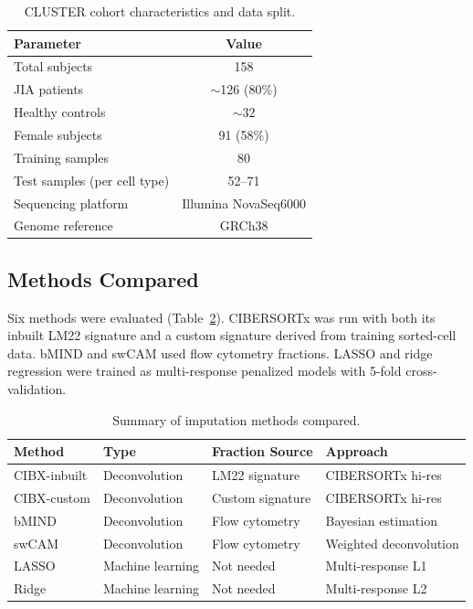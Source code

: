 \documentclass[12pt]{article}
\begin{document}
\begin{table}[htbp]
\centering
\caption{CLUSTER cohort characteristics and data split.}
\label{tab:cohort}
\begin{tabular}{lc}
\toprule
Parameter & Value \\
\midrule
Total subjects & 158 \\
JIA patients & $\sim$126 (80\%) \\
Healthy controls & $\sim$32 \\
Female subjects & 91 (58\%) \\
Training samples & 80 \\
Test samples (per cell type) & 52--71 \\
Sequencing platform & Illumina NovaSeq6000 \\
Genome reference & GRCh38 \\
\bottomrule
\end{tabular}
\end{table}

\subsection{Methods Compared}

Six methods were evaluated (Table~\ref{tab:methods}). CIBERSORTx was run with both its inbuilt LM22 signature and a custom signature derived from training sorted-cell data. bMIND and swCAM used flow cytometry fractions. LASSO and ridge regression were trained as multi-response penalized models with 5-fold cross-validation.

\begin{table}[htbp]
\centering
\caption{Summary of imputation methods compared.}
\label{tab:methods}
\begin{tabular}{llll}
\toprule
Method & Type & Fraction Source & Approach \\
\midrule
CIBX-inbuilt & Deconvolution & LM22 signature & CIBERSORTx hi-res \\
CIBX-custom & Deconvolution & Custom signature & CIBERSORTx hi-res \\
bMIND & Deconvolution & Flow cytometry & Bayesian estimation \\
swCAM & Deconvolution & Flow cytometry & Weighted deconvolution \\
LASSO & Machine learning & Not needed & Multi-response L1 \\
Ridge & Machine learning & Not needed & Multi-response L2 \\
\bottomrule
\end{tabular}
\end{table}
\end{document}
